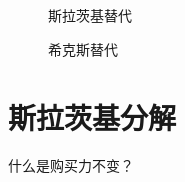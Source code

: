 
\begin{figure}[!h]
\begin{shaded*}
\begin{minipage}[t]{0.5\linewidth} 
\centering
\vspace{0pt}

\caption{斯拉茨基替代}
\label{fig:hicks-and-slutsky-substitution-effects-slutsky}
\end{minipage}%
\begin{minipage}[t]{0.5\linewidth} 
\centering
\vspace{0pt}

\caption{希克斯替代}
\label{fig:hicks-and-slutsky-substitution-effects-hicks}
\end{minipage} 
\end{shaded*}
\end{figure}


\section{斯拉茨基分解}
\label{sec:slutsky-resolution}

什么是购买力不变？

